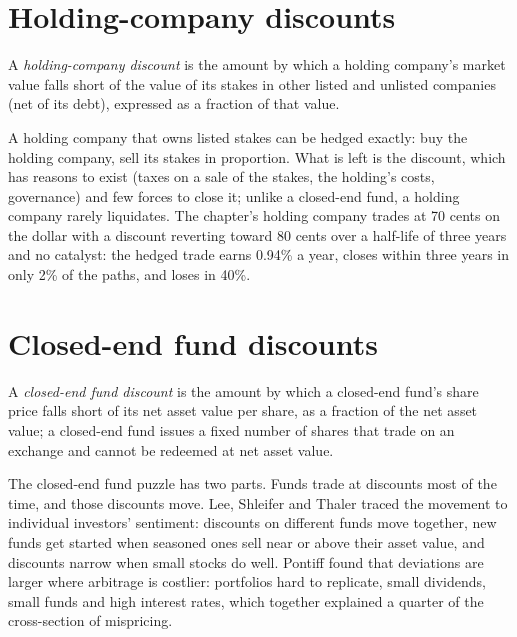 \section{Holding-company discounts}

\begin{definition}\label{def:s1:share-classes-holding-companies-closed-end-funds-spacs:holding}
A \emph{holding-company discount} is the amount by which a holding company's market value falls short of the value of its stakes in other listed and
unlisted companies (net of its debt), expressed as a fraction of that value.
\end{definition}

A holding company that owns listed stakes can be hedged exactly: buy the holding company, sell its stakes in proportion. What is left is the discount,
which has reasons to exist (taxes on a sale of the stakes, the holding's costs, governance) and few forces to close it; unlike a closed-end fund, a holding
company rarely liquidates. The chapter's holding company trades at 70 cents on the dollar with a discount reverting toward 80 cents over a half-life of three
years and no catalyst: the hedged trade earns 0.94\% a year, closes within three years in only 2\% of the paths, and loses in 40\%.

\section{Closed-end fund discounts}

\begin{definition}\label{def:s1:share-classes-holding-companies-closed-end-funds-spacs:cef}
A \emph{closed-end fund discount} is the amount by which a closed-end fund's share price falls short of its net asset value per share, as a fraction of the
net asset value; a closed-end fund issues a fixed number of shares that trade on an exchange and cannot be redeemed at net asset value.
\end{definition}

The closed-end fund puzzle has two parts. Funds trade at discounts most of the time, and those discounts move. Lee, Shleifer and Thaler traced the movement to
individual investors' sentiment: discounts on different funds move together, new funds get started when seasoned ones sell near or above their asset value,
and discounts narrow when small stocks do well. Pontiff found that deviations are larger where arbitrage is costlier: portfolios hard to replicate, small
dividends, small funds and high interest rates, which together explained a quarter of the cross-section of mispricing.

